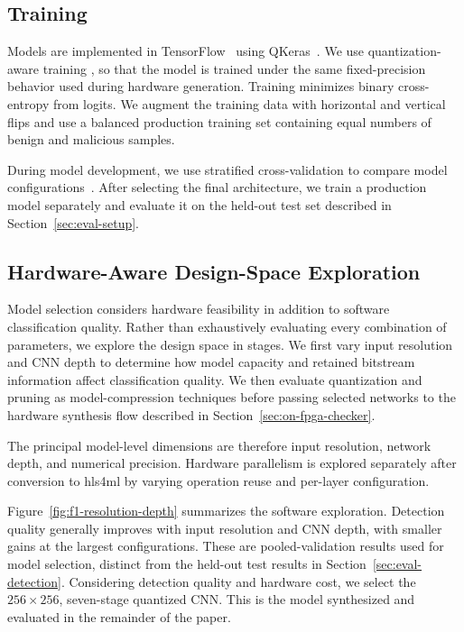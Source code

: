 \documentclass[acmsmall]{acmart}
\begin{document}
\subsection{Training}
\label{sec:cnn-training}

Models are implemented in TensorFlow~\cite{abadi2016tensorflow} using
QKeras~\cite{coelho2020automatic}. We use quantization-aware training
\cite{coelho2020automatic}, so that the model is trained under the same
fixed-precision behavior used during hardware generation. Training minimizes
binary cross-entropy from logits. We augment the training data with horizontal
and vertical flips and use a balanced production training set containing equal
numbers of benign and malicious samples.

During model development, we use stratified cross-validation to compare model
configurations~\cite{kohavi1995study}. After selecting the final architecture, we train a production
model separately and evaluate it on the held-out test set described in
Section~\ref{sec:eval-setup}.

\subsection{Hardware-Aware Design-Space Exploration}
\label{sec:cnn-design-space}

Model selection considers hardware feasibility in addition to software
classification quality. Rather than exhaustively evaluating every combination
of parameters, we explore the design space in stages. We first vary input
resolution and CNN depth to determine how model capacity and retained bitstream
information affect classification quality. We then evaluate quantization and
pruning as model-compression techniques before passing selected networks to the
hardware synthesis flow described in Section~\ref{sec:on-fpga-checker}.

The principal model-level dimensions are therefore input resolution, network
depth, and numerical precision. Hardware parallelism is explored separately
after conversion to hls4ml by varying operation reuse and per-layer
configuration.

Figure~\ref{fig:f1-resolution-depth} summarizes the software exploration.
Detection quality generally improves with input resolution and CNN depth,
with smaller gains at the largest configurations. These are pooled-validation
results used for model selection, distinct from the held-out test results in
Section~\ref{sec:eval-detection}. Considering detection quality and hardware
cost, we select the $256\times256$, seven-stage quantized CNN. This is the model
synthesized and evaluated in the remainder of the paper.
\end{document}
